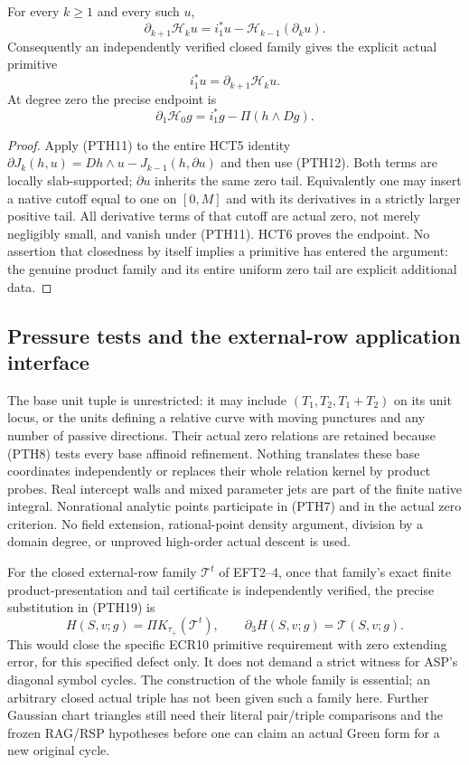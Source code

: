 \begin{theorem}
For every $k\ge1$ and every such $u$,
\[
 \partial_{k+1}\mathcal H_k u
        =i_1^*u-\mathcal H_{k-1}(\partial_k u).
 \tag{PTH18}
\]
Consequently an independently verified closed family gives the
explicit actual primitive
\[
               i_1^*u=\partial_{k+1}\mathcal H_k u.
 \tag{PTH19}
\]
At degree zero the precise endpoint is
\[
             \partial_1\mathcal H_0 g
                         =i_1^*g-\Pi(h\wedge Dg).
 \tag{PTH20}
\]
\end{theorem}

\begin{proof}
Apply (PTH11) to the entire HCT5 identity
$\partial J_k(h,u)=Dh\wedge u-J_{k-1}(h,\partial u)$
and then use (PTH12).  Both terms are locally slab-supported;
$\partial u$ inherits the same zero tail.  Equivalently one may
insert a native cutoff equal to one on $[0,M]$ and with its
derivatives in a strictly larger positive tail.  All derivative
terms of that cutoff are actual zero, not merely negligibly
small, and vanish under (PTH11).  HCT6 proves the endpoint.
No assertion that closedness by itself implies a primitive has
entered the argument: the genuine product family and its entire
uniform zero tail are explicit additional data.
\end{proof}

\subsection{Pressure tests and the external-row application interface}

The base unit tuple is unrestricted: it may include
$(T_1,T_2,T_1+T_2)$ on its unit locus, or the units defining a
relative curve with moving punctures and any number of passive
directions.  Their actual zero relations are retained because
(PTH8) tests every base affinoid refinement.  Nothing translates
these base coordinates independently or replaces their whole
relation kernel by product probes.  Real intercept walls and
mixed parameter jets are part of the finite native integral.
Nonrational analytic points participate in (PTH7) and in the
actual zero criterion.  No field extension, rational-point
density argument, division by a domain degree, or unproved
high-order actual descent is used.

For the closed external-row family $\mathcal T^t$ of EFT2--4,
once that family's exact finite product-presentation and tail
certificate is independently verified, the precise substitution
in (PTH19) is
\[
 H(S,v;g)=\Pi K_{\tau_+}(\mathcal T^t),\qquad
              \partial_3H(S,v;g)=\mathcal T(S,v;g).
 \tag{PTH21}
\]
This would close the specific ECR10 primitive requirement with
zero extending error, for this specified defect only.  It does
not demand a strict witness for ASP's diagonal symbol cycles.
The construction of the whole family is essential; an arbitrary
closed actual triple has not been given such a family here.
Further Gaussian chart triangles still need their literal
pair/triple comparisons and the frozen RAG/RSP hypotheses before
one can claim an actual Green form for a new original cycle.

